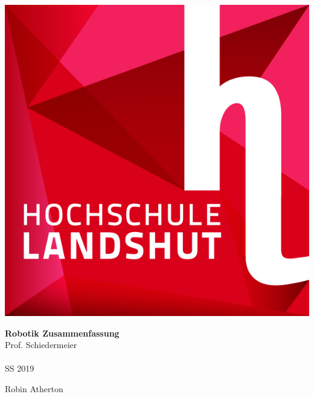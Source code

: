 \begin{titlepage}


\begin{center}
 		\includegraphics[scale=1]{Resources/Haw}
\end{center}

\begin{center}
	\HUGE \textbf{Robotik Zusammenfassung}
	\large\\Prof. Schiedermeier\\ \ \\

	SS 2019
\end{center}

\begin{center}
Robin Atherton
\end{center}

\end{titlepage}
